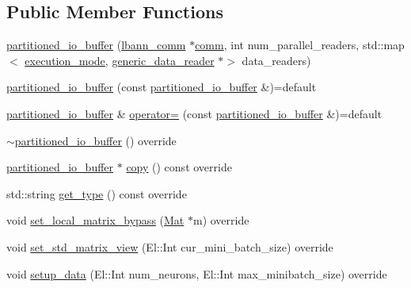 \subsection*{Public Member Functions}
\begin{DoxyCompactItemize}
\item 
\hyperlink{classlbann_1_1partitioned__io__buffer_a2dd39b740a3c0ea613cef9540d3c3e5d}{partitioned\+\_\+io\+\_\+buffer} (\hyperlink{classlbann_1_1lbann__comm}{lbann\+\_\+comm} $\ast$\hyperlink{file__io_8cpp_ab048c6f9fcbcfaa57ce68b00263dbebe}{comm}, int num\+\_\+parallel\+\_\+readers, std\+::map$<$ \hyperlink{base_8hpp_a2781a159088df64ed7d47cc91c4dc0a8}{execution\+\_\+mode}, \hyperlink{classlbann_1_1generic__data__reader}{generic\+\_\+data\+\_\+reader} $\ast$$>$ data\+\_\+readers)
\item 
\hyperlink{classlbann_1_1partitioned__io__buffer_a54a675792e2ae8d2ac4bb044b6209dcd}{partitioned\+\_\+io\+\_\+buffer} (const \hyperlink{classlbann_1_1partitioned__io__buffer}{partitioned\+\_\+io\+\_\+buffer} \&)=default
\item 
\hyperlink{classlbann_1_1partitioned__io__buffer}{partitioned\+\_\+io\+\_\+buffer} \& \hyperlink{classlbann_1_1partitioned__io__buffer_a69379e060f2ab7294c55f105f2c8d06c}{operator=} (const \hyperlink{classlbann_1_1partitioned__io__buffer}{partitioned\+\_\+io\+\_\+buffer} \&)=default
\item 
\hyperlink{classlbann_1_1partitioned__io__buffer_ada9c5ec93d1b6fbdbb6d4642f0809c1b}{$\sim$partitioned\+\_\+io\+\_\+buffer} () override
\item 
\hyperlink{classlbann_1_1partitioned__io__buffer}{partitioned\+\_\+io\+\_\+buffer} $\ast$ \hyperlink{classlbann_1_1partitioned__io__buffer_afce1a8859516dfaa482159806b75c263}{copy} () const override
\item 
std\+::string \hyperlink{classlbann_1_1partitioned__io__buffer_a55120307848cabf8ef12558594b4e9e5}{get\+\_\+type} () const override
\item 
void \hyperlink{classlbann_1_1partitioned__io__buffer_a58412c3f37ea3fbcf492f127781c7617}{set\+\_\+local\+\_\+matrix\+\_\+bypass} (\hyperlink{base_8hpp_a68f11fdc31b62516cb310831bbe54d73}{Mat} $\ast$m) override
\item 
void \hyperlink{classlbann_1_1partitioned__io__buffer_aa0a1d61dcecdd5c4091e0a97eb2d075a}{set\+\_\+std\+\_\+matrix\+\_\+view} (El\+::\+Int cur\+\_\+mini\+\_\+batch\+\_\+size) override
\item 
void \hyperlink{classlbann_1_1partitioned__io__buffer_a06a204fbf82f092b0225ab10c1bec98e}{setup\+\_\+data} (El\+::\+Int num\+\_\+neurons, El\+::\+Int max\+\_\+minibatch\+\_\+size) override
$$
\end{DoxyCompactItemize}
